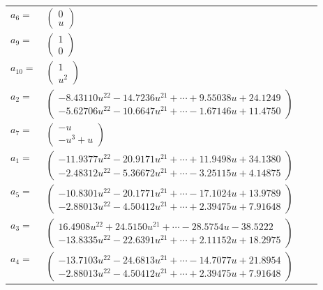 \documentclass[1p]{elsarticle_modified}
\theoremstyle{definition}
\begin{document}
\begin{tabular}{m{7pt} m{180pt} m{7pt} m{180pt} }
\flushright $a_{6}=$&$\begin{pmatrix}0\\u\end{pmatrix}$ \\
\flushright $a_{9}=$&$\begin{pmatrix}1\\0\end{pmatrix}$ \\
\flushright $a_{10}=$&$\begin{pmatrix}1\\u^2\end{pmatrix}$ \\
\flushright $a_{2}=$&$\begin{pmatrix}-8.43110 u^{22}-14.7236 u^{21}+\cdots+9.55038 u+24.1249\\-5.62706 u^{22}-10.6647 u^{21}+\cdots-1.67146 u+11.4750\end{pmatrix}$ \\
\flushright $a_{7}=$&$\begin{pmatrix}- u\\- u^3+u\end{pmatrix}$ \\
\flushright $a_{1}=$&$\begin{pmatrix}-11.9377 u^{22}-20.9171 u^{21}+\cdots+11.9498 u+34.1380\\-2.48312 u^{22}-5.36672 u^{21}+\cdots-3.25115 u+4.14875\end{pmatrix}$ \\
\flushright $a_{5}=$&$\begin{pmatrix}-10.8301 u^{22}-20.1771 u^{21}+\cdots-17.1024 u+13.9789\\-2.88013 u^{22}-4.50412 u^{21}+\cdots+2.39475 u+7.91648\end{pmatrix}$ \\
\flushright $a_{3}=$&$\begin{pmatrix}16.4908 u^{22}+24.5150 u^{21}+\cdots-28.5754 u-38.5222\\-13.8335 u^{22}-22.6391 u^{21}+\cdots+2.11152 u+18.2975\end{pmatrix}$ \\
\flushright $a_{4}=$&$\begin{pmatrix}-13.7103 u^{22}-24.6813 u^{21}+\cdots-14.7077 u+21.8954\\-2.88013 u^{22}-4.50412 u^{21}+\cdots+2.39475 u+7.91648\end{pmatrix}$ \\

\end{tabular}
\end{document}
